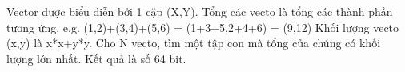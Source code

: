 Vector được biểu diễn bởi 1 cặp (X,Y). Tổng các vecto là tổng các thành phần tương ứng. e.g. (1,2)+(3,4)+(5,6) = (1+3+5,2+4+6) = (9,12)  Khối lượng vecto (x,y) là x*x+y*y.  Cho N vecto, tìm một tập con mà tổng của chúng có khối lượng lớn nhất. Kết quả là số 64 bit.  

\